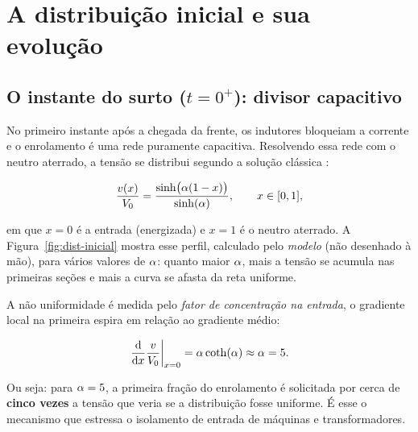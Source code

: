 \section{A distribuição inicial e sua evolução}
\label{sec:distribuicao}

\subsection{O instante do surto (\texorpdfstring{$t=0^+$}{t=0+}): divisor capacitivo}

No primeiro instante após a chegada da frente, os indutores bloqueiam a corrente e o enrolamento é uma
rede puramente capacitiva. Resolvendo essa rede com o neutro aterrado, a tensão se distribui segundo a
solução clássica \cite{greenwood1991}:

\begin{equation}
\frac{v(x)}{V_0} = \frac{\sinh\!\big(\alpha(1-x)\big)}{\sinh(\alpha)},
\qquad x \in [0,1],
\label{eq:sinh}
\end{equation}

em que \(x=0\) é a entrada (energizada) e \(x=1\) é o neutro aterrado. A Figura~\ref{fig:dist-inicial}
mostra esse perfil, calculado pelo \emph{modelo} (não desenhado à mão), para vários valores de
\(\alpha\): quanto maior \(\alpha\), mais a tensão se acumula nas primeiras seções e mais a curva se
afasta da reta uniforme.


A não uniformidade é medida pelo \emph{fator de concentração na entrada}, o gradiente local na primeira
espira em relação ao gradiente médio:

\begin{equation}
\left.\frac{\mathrm{d}}{\mathrm{d}x}\frac{v}{V_0}\right|_{x=0}
   = \alpha\coth(\alpha) \approx \alpha = 5 .
\label{eq:concentracao}
\end{equation}

Ou seja: para \(\alpha=5\), a primeira fração do enrolamento é solicitada por cerca de \textbf{cinco
vezes} a tensão que veria se a distribuição fosse uniforme. É esse o mecanismo que estressa o isolamento
de entrada de máquinas e transformadores.

